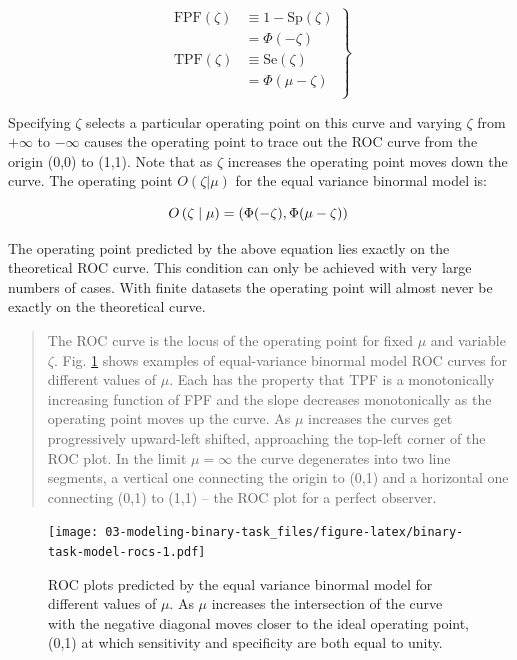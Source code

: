 \documentclass[
]{book}
\begin{document}
\begin{equation} 
\left.
\begin{aligned}  
\text{FPF}\left ( \zeta \right ) &\equiv 1 - \text{Sp}\left ( \zeta \right ) \\
&=\Phi\left ( -\zeta \right )\\
\text{TPF}\left ( \zeta \right ) &\equiv \text{Se}\left ( \zeta \right ) \\
&=\Phi\left (\mu -\zeta \right )\\ 
\end{aligned}
\right \}
\label{eq:binary-task-model-fpf-tpf}
\end{equation}

Specifying \(\zeta\) selects a particular operating point on this curve and varying \(\zeta\) from \(+\infty\) to \(-\infty\) causes the operating point to trace out the ROC curve from the origin (0,0) to (1,1). Note that as \(\zeta\) increases the operating point moves down the curve. The operating point \(O(\zeta|\mu)\) for the equal variance binormal model is:

\begin{equation} 
O\left ( \zeta \mid \mu \right ) = \left ( \Phi(-\zeta), \Phi(\mu-\zeta) \right ) \\
\label{eq:binary-task-model-op-pt}
\end{equation}

The operating point predicted by the above equation lies exactly on the theoretical ROC curve. This condition can only be achieved with very large numbers of cases. With finite datasets the operating point will almost never be exactly on the theoretical curve.

\begin{quote}
The ROC curve is the locus of the operating point for fixed \(\mu\) and variable \(\zeta\). Fig. \ref{fig:binary-task-model-rocs} shows examples of equal-variance binormal model ROC curves for different values of \(\mu\). Each has the property that TPF is a monotonically increasing function of FPF and the slope decreases monotonically as the operating point moves up the curve. As \(\mu\) increases the curves get progressively upward-left shifted, approaching the top-left corner of the ROC plot. In the limit \(\mu = \infty\) the curve degenerates into two line segments, a vertical one connecting the origin to (0,1) and a horizontal one connecting (0,1) to (1,1) -- the ROC plot for a perfect observer.
\end{quote}

\begin{figure}
\centering
\texttt{[image: 03-modeling-binary-task\_files/figure-latex/binary-task-model-rocs-1.pdf]}
\caption{\label{fig:binary-task-model-rocs}ROC plots predicted by the equal variance binormal model for different values of \(\mu\). As \(\mu\) increases the intersection of the curve with the negative diagonal moves closer to the ideal operating point, (0,1) at which sensitivity and specificity are both equal to unity.}
\end{figure}
\end{document}

